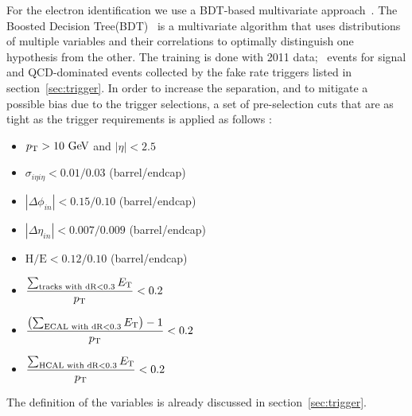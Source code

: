 For the electron identification we use a BDT-based multivariate 
approach~\cite{Chatrchyan:2012ufa}. The Boosted Decision Tree(BDT)~\cite{Hocker:2007ht} 
is a multivariate algorithm that uses distributions of multiple variables 
and their correlations to optimally distinguish one hypothesis from the other.  
The training is done with 2011 data; \dyll\ events for signal and QCD-dominated events 
collected by the fake rate triggers listed in section~\ref{sec:trigger}. 
In order to increase the separation, and to mitigate a possible bias 
due to the trigger selections, a set of pre-selection cuts that are as tight as the trigger 
requirements is applied as follows :  
\begin{itemize}
  \item $p_\mathrm{T}>10~\mathrm{Ge\kern -0.1em V}$ and $|\eta| < 2.5$
  \item $\sigma_{i\eta i\eta} < 0.01/0.03$ (barrel/endcap)
  \item $|\Delta\phi_{in}| < 0.15/0.10$ (barrel/endcap)
  \item $|\Delta\eta_{in}| < 0.007/0.009$ (barrel/endcap)
  \item $\textrm{H/E}< 0.12/0.10$ (barrel/endcap)
  \item $\displaystyle \frac{\sum_{\textrm{tracks with dR}<0.3}E_\mathrm{T}}{p_\mathrm{T}}<0.2$
  \item $\displaystyle \frac{\left(\sum_{\textrm{ECAL with dR}<0.3}E_\mathrm{T}\right)-1}{p_\mathrm{T}}<0.2$
  \item $\displaystyle \frac{\sum_{\textrm{HCAL with dR}<0.3}E_\mathrm{T}}{p_\mathrm{T}}<0.2$
\end{itemize}
The definition of the variables is already discussed in section~\ref{sec:trigger}. 

